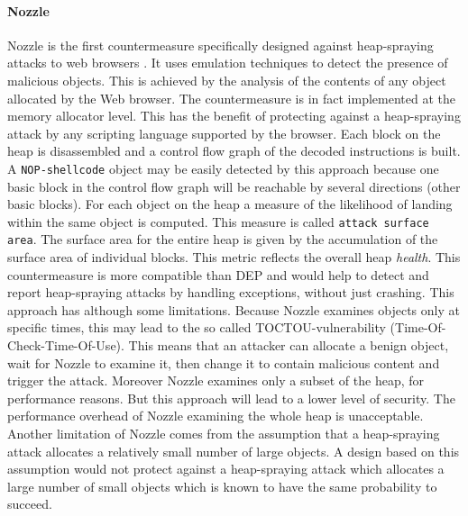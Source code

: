 \paragraph{Nozzle} 
Nozzle is the first countermeasure specifically designed against heap-spraying attacks to web browsers \cite{nozzle08tr}. It uses emulation techniques to detect the presence of malicious objects. This is achieved by the analysis of the contents of any object allocated by the Web browser. The countermeasure is in fact implemented at the memory allocator level. This has the benefit of protecting against a heap-spraying attack by any scripting language supported by the browser.
Each block on the heap is disassembled and a control flow graph of the decoded instructions is built. A \texttt{NOP-shellcode} object may be easily detected by this approach because one basic block in the control flow graph will be reachable by several directions (other basic blocks). For each object on the heap a measure of the likelihood of landing within the same object is computed. This measure is called \texttt{attack surface area}. The surface area for the entire heap is given by the accumulation of the surface area of individual blocks. This metric reflects the overall heap \textit{health}. 
This countermeasure is more compatible than DEP and would help to detect and report heap-spraying attacks by handling exceptions, without just crashing. This approach has although some limitations. Because Nozzle examines objects only at specific times, this may lead to the so called TOCTOU-vulnerability (Time-Of-Check-Time-Of-Use). This means that an attacker can allocate a benign object, wait for Nozzle to examine it, then change it to contain malicious content and trigger the attack. Moreover Nozzle examines only a subset of the heap, for performance reasons. But this approach will lead to a lower level of security. The performance overhead of Nozzle examining the whole heap is unacceptable.
Another limitation of Nozzle comes from the assumption that a heap-spraying attack allocates a relatively small number of large objects. A design based on this assumption would not protect against a heap-spraying attack which allocates a large number of small objects which is known to have the same probability to succeed. 

